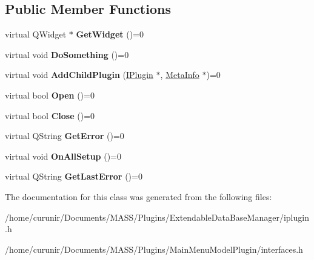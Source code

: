 \subsection*{Public Member Functions}
\begin{DoxyCompactItemize}
\item 
virtual Q\+Widget $\ast$ {\bfseries Get\+Widget} ()=0\hypertarget{class_i_plugin_a2d7fd6ff64386dc3451d93a766cfe5ac}{}\label{class_i_plugin_a2d7fd6ff64386dc3451d93a766cfe5ac}

\item 
virtual void {\bfseries Do\+Something} ()=0\hypertarget{class_i_plugin_a4fe502f97b8dd2dee1e027031f2bf3bc}{}\label{class_i_plugin_a4fe502f97b8dd2dee1e027031f2bf3bc}

\item 
virtual void {\bfseries Add\+Child\+Plugin} (\hyperlink{class_i_plugin}{I\+Plugin} $\ast$, \hyperlink{struct_meta_info}{Meta\+Info} $\ast$)=0\hypertarget{class_i_plugin_a4260318b1f6d80db0c77631465153c3e}{}\label{class_i_plugin_a4260318b1f6d80db0c77631465153c3e}

\item 
virtual bool {\bfseries Open} ()=0\hypertarget{class_i_plugin_aa8a0de947d8556119eca015c3102c8a0}{}\label{class_i_plugin_aa8a0de947d8556119eca015c3102c8a0}

\item 
virtual bool {\bfseries Close} ()=0\hypertarget{class_i_plugin_aa871cff89f6fec30f76481b5ddd689bf}{}\label{class_i_plugin_aa871cff89f6fec30f76481b5ddd689bf}

\item 
virtual Q\+String {\bfseries Get\+Error} ()=0\hypertarget{class_i_plugin_ac22c5e1c522d1827ae8c81cf14bb52df}{}\label{class_i_plugin_ac22c5e1c522d1827ae8c81cf14bb52df}

\item 
virtual void {\bfseries On\+All\+Setup} ()=0\hypertarget{class_i_plugin_a6cfbb338c5be95b42079d935aad8f02f}{}\label{class_i_plugin_a6cfbb338c5be95b42079d935aad8f02f}

\item 
virtual Q\+String {\bfseries Get\+Last\+Error} ()=0\hypertarget{class_i_plugin_a47261bd639ed10f898fd4ecfbc74f4a9}{}\label{class_i_plugin_a47261bd639ed10f898fd4ecfbc74f4a9}

\end{DoxyCompactItemize}


The documentation for this class was generated from the following files\+:\begin{DoxyCompactItemize}
\item 
/home/curunir/\+Documents/\+M\+A\+S\+S/\+Plugins/\+Extendable\+Data\+Base\+Manager/iplugin.\+h\item 
/home/curunir/\+Documents/\+M\+A\+S\+S/\+Plugins/\+Main\+Menu\+Model\+Plugin/interfaces.\+h\end{DoxyCompactItemize}
